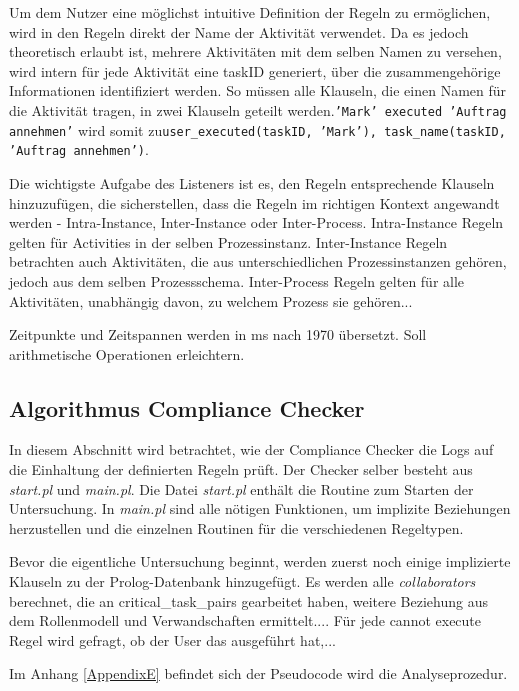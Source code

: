 Um dem Nutzer eine möglichst intuitive Definition der Regeln zu ermöglichen, wird in den Regeln direkt der Name der Aktivität verwendet. Da es jedoch theoretisch erlaubt ist, mehrere Aktivitäten mit dem selben Namen zu versehen, wird intern für jede Aktivität eine taskID generiert, über die zusammengehörige Informationen identifiziert werden. So müssen alle Klauseln, die einen Namen für die Aktivität tragen, in zwei Klauseln geteilt werden.\newline \texttt{'Mark' executed 'Auftrag annehmen'} wird somit zu\newline \texttt{user\_executed(taskID, 'Mark'), task\_name(taskID, 'Auftrag annehmen')}.

Die wichtigste Aufgabe des Listeners ist es, den Regeln entsprechende Klauseln hinzuzufügen, die sicherstellen, dass die Regeln im richtigen Kontext angewandt werden - Intra-Instance, Inter-Instance oder Inter-Process. Intra-Instance Regeln gelten für Activities in der selben Prozessinstanz. Inter-Instance Regeln betrachten auch Aktivitäten, die aus unterschiedlichen Prozessinstanzen gehören, jedoch aus dem selben Prozessschema. Inter-Process Regeln gelten für alle Aktivitäten, unabhängig davon, zu welchem Prozess sie gehören...

Zeitpunkte und Zeitspannen werden in ms nach 1970 übersetzt. Soll arithmetische Operationen erleichtern.

%
%
\subsection{Algorithmus Compliance Checker}
\label{sec:compliancechecker}
In diesem Abschnitt wird betrachtet, wie der Compliance Checker die Logs auf die Einhaltung der definierten Regeln prüft. Der Checker selber besteht aus \textit{start.pl} und \textit{main.pl}. Die Datei \textit{start.pl} enthält die Routine zum Starten der Untersuchung. In \textit{main.pl} sind alle nötigen Funktionen, um implizite Beziehungen herzustellen und die einzelnen Routinen für die verschiedenen Regeltypen.

Bevor die eigentliche Untersuchung beginnt, werden zuerst noch einige implizierte Klauseln zu der Prolog-Datenbank hinzugefügt. Es werden alle \textit{collaborators} berechnet, die an {critical\_task\_pairs} gearbeitet haben, weitere Beziehung aus dem Rollenmodell und Verwandschaften ermittelt....
Für jede cannot execute Regel wird gefragt, ob der User das ausgeführt hat,...

Im Anhang \ref{AppendixE} befindet sich der Pseudocode wird die Analyseprozedur.

